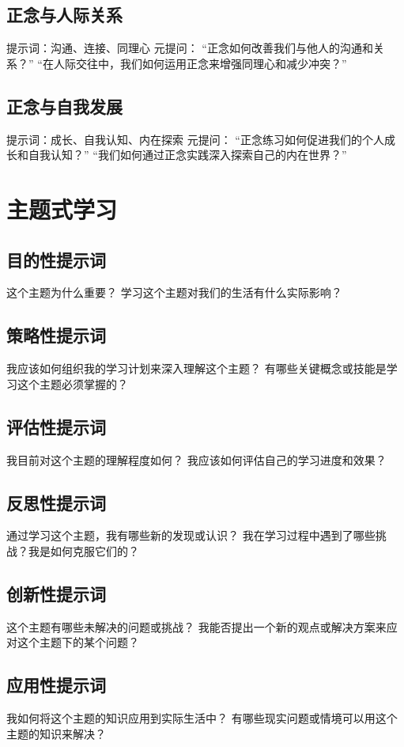 \documentclass[12pt]{book}
\begin{document}
\subsection{正念与人际关系}
提示词：沟通、连接、同理心
元提问：
“正念如何改善我们与他人的沟通和关系？”
“在人际交往中，我们如何运用正念来增强同理心和减少冲突？”

\subsection{正念与自我发展}
提示词：成长、自我认知、内在探索
元提问：
“正念练习如何促进我们的个人成长和自我认知？”
“我们如何通过正念实践深入探索自己的内在世界？”

\section{主题式学习}
\subsection{目的性提示词}
这个主题为什么重要？
学习这个主题对我们的生活有什么实际影响？

\subsection{策略性提示词}
我应该如何组织我的学习计划来深入理解这个主题？
有哪些关键概念或技能是学习这个主题必须掌握的？

\subsection{评估性提示词}
我目前对这个主题的理解程度如何？
我应该如何评估自己的学习进度和效果？

\subsection{反思性提示词}
通过学习这个主题，我有哪些新的发现或认识？
我在学习过程中遇到了哪些挑战？我是如何克服它们的？

\subsection{创新性提示词}
这个主题有哪些未解决的问题或挑战？
我能否提出一个新的观点或解决方案来应对这个主题下的某个问题？

\subsection{应用性提示词}
我如何将这个主题的知识应用到实际生活中？
有哪些现实问题或情境可以用这个主题的知识来解决？
\end{document}
